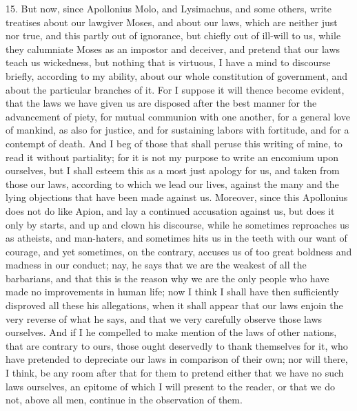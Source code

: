 15. But now, since Apollonius Molo, and Lysimachus, and some others, write
treatises about our lawgiver Moses, and about our laws, which are neither
just nor true, and this partly out of ignorance, but chiefly out of
ill-will to us, while they calumniate Moses as an impostor and deceiver,
and pretend that our laws teach us wickedness, but nothing that is
virtuous, I have a mind to discourse briefly, according to my ability,
about our whole constitution of government, and about the particular
branches of it. For I suppose it will thence become evident, that the laws
we have given us are disposed after the best manner for the advancement of
piety, for mutual communion with one another, for a general love of
mankind, as also for justice, and for sustaining labors with fortitude,
and for a contempt of death. And I beg of those that shall peruse this
writing of mine, to read it without partiality; for it is not my purpose
to write an encomium upon ourselves, but I shall esteem this as a most
just apology for us, and taken from those our laws, according to which we
lead our lives, against the many and the lying objections that have been
made against us. Moreover, since this Apollonius does not do like Apion,
and lay a continued accusation against us, but does it only by starts, and
up and clown his discourse, while he sometimes reproaches us as atheists,
and man-haters, and sometimes hits us in the teeth with our want of
courage, and yet sometimes, on the contrary, accuses us of too great
boldness and madness in our conduct; nay, he says that we are the weakest
of all the barbarians, and that this is the reason why we are the only
people who have made no improvements in human life; now I think I shall
have then sufficiently disproved all these his allegations, when it shall
appear that our laws enjoin the very reverse of what he says, and that we
very carefully observe those laws ourselves. And if I he compelled to make
mention of the laws of other nations, that are contrary to ours, those
ought deservedly to thank themselves for it, who have pretended to
depreciate our laws in comparison of their own; nor will there, I think,
be any room after that for them to pretend either that we have no such
laws ourselves, an epitome of which I will present to the reader, or that
we do not, above all men, continue in the observation of them.

